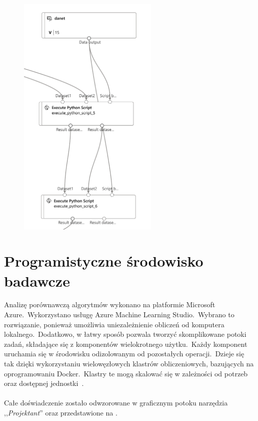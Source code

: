 \begin{figure}[H]
    \centering
    \includegraphics[width=0.6\textwidth]{images/danet}
    \label{fig:danet-pipe}
\end{figure}


\section{Programistyczne środowisko badawcze}
Analizę porównawczą algorytmów wykonano na platformie Microsoft Azure.\ Wykorzystano usługę Azure Machine Learning Studio.\ Wybrano to rozwiązanie, ponieważ umożliwia uniezależnienie obliczeń od komputera lokalnego.\ Dodatkowo, w łatwy sposób pozwala tworzyć skomplikowane potoki zadań, składające się z komponentów wielokrotnego użytku.\ Każdy komponent uruchamia się w środowisku odizolowanym od pozostałych operacji.\ Dzieje się tak dzięki wykorzystaniu wielowęzłowych klastrów obliczeniowych, bazujących na oprogramowaniu Docker.\ Klastry te mogą skalować się w zależności od potrzeb oraz dostępnej jednostki~\cite{MicrosoftLearn2023}.
\\ \\
Całe doświadczenie zostało odwzorowane w graficznym potoku narzędzia ,,\textit{Projektant}'' oraz przedstawione na .

